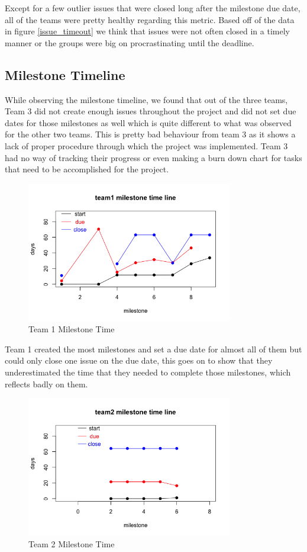 \documentclass[conference]{IEEEtran}
\begin{document}
Except for a few outlier issues that were closed long after the milestone due date, all of the teams were pretty healthy regarding this metric. Based off of the data in figure \ref{issue_timeout} we think that issues were not often closed in a timely manner or the groups were big on procrastinating until the deadline. 


\subsection{Milestone Timeline}

While observing the milestone timeline, we found that out of the three teams, Team 3 did not create enough issues throughout the project and did not set due dates for those milestones as well which is quite different to what was observed for the other two teams. This is pretty bad behaviour from team 3 as it shows a lack of proper procedure through which the project was implemented. Team 3 had no way of tracking their progress or even making a burn down chart for tasks that need to be accomplished for the project. 

\begin{figure}[H]
    \centering
    \includegraphics[width=9cm]{../AprilProject/pic/team1_milestone_time.png}
    \caption{Team 1 Milestone Time}
    \label{team1_milestone_time}
\end{figure}

Team 1 created the most milestones and set a due date for almost all of them but could only close one issue on the due date, this goes on to show that they underestimated the time that they needed to complete those milestones, which reflects badly on them.


\begin{figure}[H]
    \centering
    \includegraphics[width=9cm]{../AprilProject/pic/team2_milestone_time.png}
    \caption{Team 2 Milestone Time}
    \label{team2_milestone_time}
\end{figure}
\end{document}

